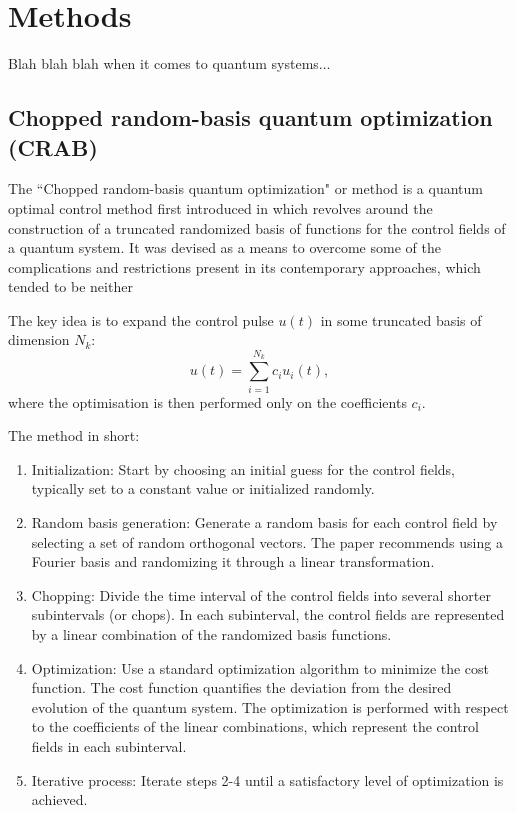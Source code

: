 
\section{Methods}

Blah blah blah when it comes to quantum systems...

\subsection{Chopped random-basis quantum optimization (CRAB)}\label{sec:3.3.1_CRAB}

The ``Chopped random-basis quantum optimization" or  method is a quantum optimal control method first introduced in \cite{doria_optimal_2011, caneva_chopped_2011} which revolves around the construction of a truncated randomized basis of functions for the control fields of a quantum system. It was devised as a means to overcome some of the complications and restrictions present in its contemporary approaches, which tended to be neither 

The key idea is to expand the control pulse $u(t)$ in some truncated basis of dimension $N_k$: 
\begin{equation}
    u(t) = \sum_{i = 1}^{N_k} c_i u_i(t),
\end{equation}
where the optimisation is then performed only on the coefficients $c_i$. 

The method in short:
\begin{enumerate}
    \item Initialization: Start by choosing an initial guess for the control fields, typically set to a constant value or initialized randomly.
    \item Random basis generation: Generate a random basis for each control field by selecting a set of random orthogonal vectors. The paper recommends using a Fourier basis and randomizing it through a linear transformation.
    \item Chopping: Divide the time interval of the control fields into several shorter subintervals (or chops). In each subinterval, the control fields are represented by a linear combination of the randomized basis functions.
    \item Optimization: Use a standard optimization algorithm to minimize the cost function. The cost function quantifies the deviation from the desired evolution of the quantum system. The optimization is performed with respect to the coefficients of the linear combinations, which represent the control fields in each subinterval.
    \item Iterative process: Iterate steps 2-4 until a satisfactory level of optimization is achieved.
\end{enumerate}

